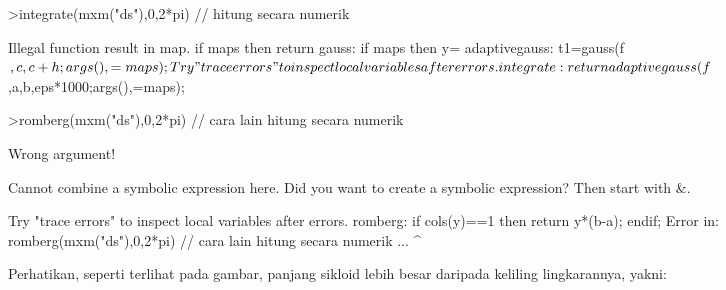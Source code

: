 \documentclass[a4paper,10pt]{article}
\begin{document}
\begin{eulernotebook}
\begin{eulercomment}
\begin{eulercomment}
\begin{eulercomment}
\begin{eulercomment}
\begin{eulercomment}
\begin{eulercomment}
\begin{eulercomment}
\begin{eulercomment}
\begin{eulercomment}
\begin{eulercomment}
\begin{eulercomment}
\begin{eulercomment}
\begin{eulercomment}
\begin{eulercomment}
\begin{eulercomment}
\begin{eulercomment}
\begin{eulercomment}
\begin{eulercomment}
\begin{eulercomment}
\begin{eulercomment}
\begin{eulercomment}
\begin{eulercomment}
\begin{eulercomment}
\begin{eulercomment}
\begin{eulercomment}
\begin{eulercomment}
\begin{eulercomment}
\begin{eulercomment}
\begin{eulerprompt}
>integrate(mxm("ds"),0,2*pi) // hitung secara numerik
\end{eulerprompt}
\begin{euleroutput}
  Illegal function result in map.
      if maps then return %
  gauss:
      if maps then y=%
  adaptivegauss:
      t1=gauss(f$,c,c+h;args(),=maps);
  Try "trace errors" to inspect local variables after errors.
  integrate:
      return adaptivegauss(f$,a,b,eps*1000;args(),=maps);
\end{euleroutput}
\begin{eulerprompt}
>romberg(mxm("ds"),0,2*pi) // cara lain hitung secara numerik
\end{eulerprompt}
\begin{euleroutput}
  Wrong argument!
  
  Cannot combine a symbolic expression here.
  Did you want to create a symbolic expression?
  Then start with &.
  
  Try "trace errors" to inspect local variables after errors.
  romberg:
      if cols(y)==1 then return y*(b-a); endif;
  Error in:
  romberg(mxm("ds"),0,2*pi) // cara lain hitung secara numerik ...
                           ^
\end{euleroutput}
\begin{eulercomment}
Perhatikan, seperti terlihat pada gambar, panjang sikloid lebih besar
daripada keliling lingkarannya, yakni:


\end{eulercomment}
\end{eulercomment}
\end{eulercomment}
\end{eulercomment}
\end{eulercomment}
\end{eulercomment}
\end{eulercomment}
\end{eulercomment}
\end{eulercomment}
\end{eulercomment}
\end{eulercomment}
\end{eulercomment}
\end{eulercomment}
\end{eulercomment}
\end{eulercomment}
\end{eulercomment}
\end{eulercomment}
\end{eulercomment}
\end{eulercomment}
\end{eulercomment}
\end{eulercomment}
\end{eulercomment}
\end{eulercomment}
\end{eulercomment}
\end{eulercomment}
\end{eulercomment}
\end{eulercomment}
\end{eulercomment}
\end{eulercomment}
\end{eulernotebook}
\end{document}
